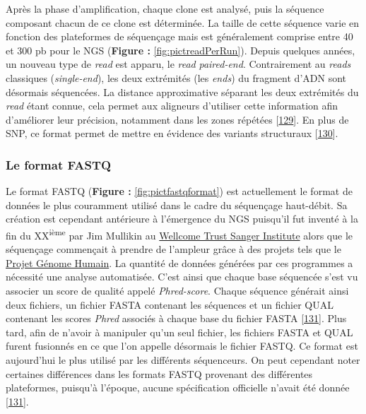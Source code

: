 \documentclass[12pt,a4paper,twoside]{ugathesis}
\theoremstyle{definition}
\theoremstyle{definition}
\theoremstyle{definition}
\theoremstyle{remark}
\begin{document}
Après la phase d'amplification, chaque clone est analysé, puis la
séquence composant chacun de ce clone est déterminée. La taille de cette
séquence varie en fonction des plateformes de séquençage mais est
généralement comprise entre 40 et 300 pb pour le NGS (\textbf{Figure :
}\ref{fig:pictreadPerRun}). Depuis quelques années, un nouveau type de
\emph{read} est apparu, le \emph{read} \emph{paired-end}. Contrairement
au \emph{reads} classiques (\emph{single-end}), les deux extrémités (les
\emph{ends}) du fragment d'ADN sont désormais séquencées. La distance
approximative séparant les deux extrémités du \emph{read} étant connue,
cela permet aux aligneurs d'utiliser cette information afin d'améliorer
leur précision, notamment dans les zones répétées
{[}\protect\hyperlink{ref-Li2008}{129}{]}. En plus de SNP, ce format
permet de mettre en évidence des variants structuraux
{[}\protect\hyperlink{ref-Korbel2009}{130}{]}.

\newpage

\subsubsection{Le format FASTQ}\label{fastq}

Le format FASTQ (\textbf{Figure : }\ref{fig:pictfastqformat}) est
actuellement le format de données le plus couramment utilisé dans le
cadre du séquençage haut-débit. Sa création est cependant antérieure à
l'émergence du NGS puisqu'il fut inventé à la fin du
XX\textsuperscript{ième} par Jim Mullikin au
\href{https://fr.wikipedia.org/wiki/Wellcome_Trust_Sanger_Institute}{Wellcome
Trust Sanger Institute} alors que le séquençage commençait à prendre de
l'ampleur grâce à des projets tels que le
\href{https://fr.wikipedia.org/wiki/Projet_G\%C3\%A9nome_Humain}{Projet
Génome Humain}. La quantité de données générées par ces programmes a
nécessité une analyse automatisée. C'est ainsi que chaque base séquencée
s'est vu associer un score de qualité appelé \emph{Phred-score}. Chaque
séquence générait ainsi deux fichiers, un fichier FASTA contenant les
séquences et un fichier QUAL contenant les scores \emph{Phred} associés
à chaque base du fichier FASTA
{[}\protect\hyperlink{ref-Cock2009}{131}{]}. Plus tard, afin de n'avoir
à manipuler qu'un seul fichier, les fichiers FASTA et QUAL furent
fusionnés en ce que l'on appelle désormais le fichier FASTQ. Ce format
est aujourd'hui le plus utilisé par les différents séquenceurs. On peut
cependant noter certaines différences dans les formats FASTQ provenant
des différentes plateformes, puisqu'à l'époque, aucune spécification
officielle n'avait été donnée
{[}\protect\hyperlink{ref-Cock2009}{131}{]}.
\end{document}
